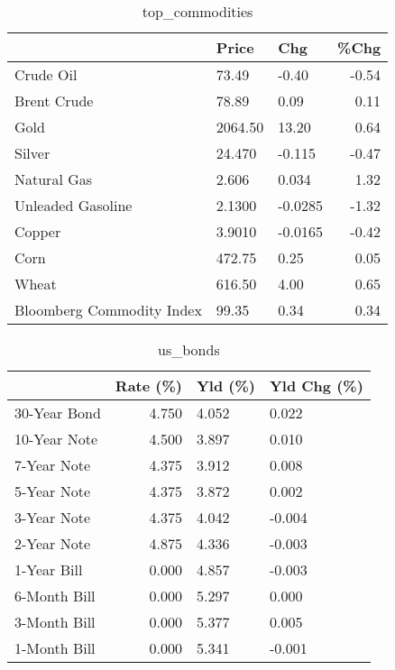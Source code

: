 \documentclass{article}%
\begin{document}
\begin{table}[htbp]%
\caption{top\_commodities}%
\centering%
\begin{adjustbox}{width=1\textwidth}%
\begin{tabular}{lllr}
\toprule
                          &   Price &     Chg &  \%Chg \\
\midrule
               Crude Oil  &   73.49 &   -0.40 & -0.54 \\
             Brent Crude  &   78.89 &    0.09 &  0.11 \\
                    Gold  & 2064.50 &   13.20 &  0.64 \\
                  Silver  &  24.470 &  -0.115 & -0.47 \\
             Natural Gas  &   2.606 &   0.034 &  1.32 \\
       Unleaded Gasoline  &  2.1300 & -0.0285 & -1.32 \\
                  Copper  &  3.9010 & -0.0165 & -0.42 \\
                    Corn  &  472.75 &    0.25 &  0.05 \\
                   Wheat  &  616.50 &    4.00 &  0.65 \\
Bloomberg Commodity Index &   99.35 &    0.34 &  0.34 \\
\bottomrule
\end{tabular}
%
\end{adjustbox}%
\end{table}

%


\begin{table}[htbp]%
\caption{us\_bonds}%
\centering%
\begin{adjustbox}{width=1\textwidth}%
\begin{tabular}{lrll}
\toprule
             &  Rate (\%) & Yld (\%) & Yld Chg (\%) \\
\midrule
30-Year Bond &     4.750 &   4.052 &       0.022 \\
10-Year Note &     4.500 &   3.897 &       0.010 \\
 7-Year Note &     4.375 &   3.912 &       0.008 \\
 5-Year Note &     4.375 &   3.872 &       0.002 \\
 3-Year Note &     4.375 &   4.042 &      -0.004 \\
 2-Year Note &     4.875 &   4.336 &      -0.003 \\
 1-Year Bill &     0.000 &   4.857 &      -0.003 \\
6-Month Bill &     0.000 &   5.297 &       0.000 \\
3-Month Bill &     0.000 &   5.377 &       0.005 \\
1-Month Bill &     0.000 &   5.341 &      -0.001 \\
\bottomrule
\end{tabular}
%
\end{adjustbox}%
\end{table}
\end{document}
